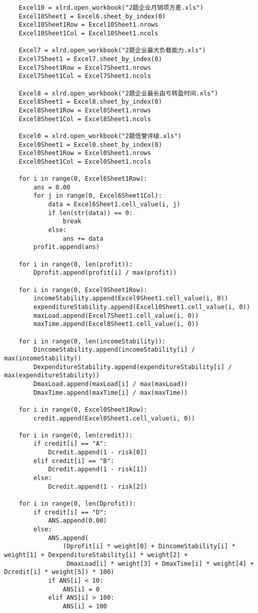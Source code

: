 \documentclass[dvipsnames,withoutpreface,bwprint]{cumcmthesis}
\begin{document}
\begin{appendices}
\begin{lstlisting}
    Excel10 = xlrd.open_workbook("2题企业月销项方差.xls")
    Excel10Sheet1 = Excel6.sheet_by_index(0)
    Excel10Sheet1Row = Excel10Sheet1.nrows
    Excel10Sheet1Col = Excel10Sheet1.ncols

    Excel7 = xlrd.open_workbook("2题企业最大负载能力.xls")
    Excel7Sheet1 = Excel7.sheet_by_index(0)
    Excel7Sheet1Row = Excel7Sheet1.nrows
    Excel7Sheet1Col = Excel7Sheet1.ncols

    Excel8 = xlrd.open_workbook("2题企业最长由亏转盈时间.xls")
    Excel8Sheet1 = Excel8.sheet_by_index(0)
    Excel8Sheet1Row = Excel8Sheet1.nrows
    Excel8Sheet1Col = Excel8Sheet1.ncols

    Excel0 = xlrd.open_workbook("2题信誉评级.xls")
    Excel0Sheet1 = Excel0.sheet_by_index(0)
    Excel0Sheet1Row = Excel0Sheet1.nrows
    Excel0Sheet1Col = Excel0Sheet1.ncols

    for i in range(0, Excel6Sheet1Row):
        ans = 0.00
        for j in range(0, Excel6Sheet1Col):
            data = Excel6Sheet1.cell_value(i, j)
            if len(str(data)) == 0:
                break
            else:
                ans += data
        profit.append(ans)

    for i in range(0, len(profit)):
        Dprofit.append(profit[i] / max(profit))

    for i in range(0, Excel9Sheet1Row):
        incomeStability.append(Excel9Sheet1.cell_value(i, 0))
        expenditureStability.append(Excel10Sheet1.cell_value(i, 0))
        maxLoad.append(Excel7Sheet1.cell_value(i, 0))
        maxTime.append(Excel8Sheet1.cell_value(i, 0))

    for i in range(0, len(incomeStability)):
        DincomeStability.append(incomeStability[i] / max(incomeStability))
        DexpenditureStability.append(expenditureStability[i] / max(expenditureStability))
        DmaxLoad.append(maxLoad[i] / max(maxLoad))
        DmaxTime.append(maxTime[i] / max(maxTime))

    for i in range(0, Excel0Sheet1Row):
        credit.append(Excel0Sheet1.cell_value(i, 0))

    for i in range(0, len(credit)):
        if credit[i] == "A":
            Dcredit.append(1 - risk[0])
        elif credit[i] == "B":
            Dcredit.append(1 - risk[1])
        else:
            Dcredit.append(1 - risk[2])

    for i in range(0, len(Dprofit)):
        if credit[i] == "D":
            ANS.append(0.00)
        else:
            ANS.append(
                (Dprofit[i] * weight[0] + DincomeStability[i] * weight[1] + DexpenditureStability[i] * weight[2] +
                 DmaxLoad[i] * weight[3] + DmaxTime[i] * weight[4] + Dcredit[i] * weight[5]) * 100)
            if ANS[i] < 10:
                ANS[i] = 0
            elif ANS[i] > 100:
                ANS[i] = 100


\end{lstlisting}
\end{appendices}
\end{document}
